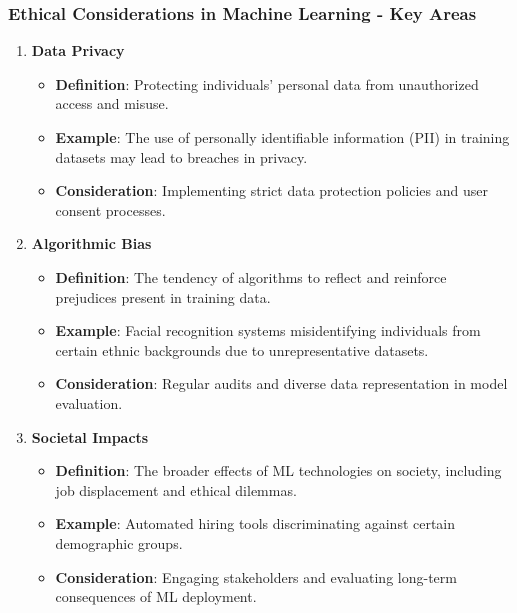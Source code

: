 \documentclass[aspectratio=169]{beamer}
\begin{document}
\begin{frame}[fragile]
    \frametitle{Ethical Considerations in Machine Learning - Key Areas}
    \begin{enumerate}
        \item \textbf{Data Privacy}
            \begin{itemize}
                \item \textbf{Definition}: Protecting individuals' personal data from unauthorized access and misuse.
                \item \textbf{Example}: The use of personally identifiable information (PII) in training datasets may lead to breaches in privacy.
                \item \textbf{Consideration}: Implementing strict data protection policies and user consent processes.
            \end{itemize}
            
        \item \textbf{Algorithmic Bias}
            \begin{itemize}
                \item \textbf{Definition}: The tendency of algorithms to reflect and reinforce prejudices present in training data.
                \item \textbf{Example}: Facial recognition systems misidentifying individuals from certain ethnic backgrounds due to unrepresentative datasets.
                \item \textbf{Consideration}: Regular audits and diverse data representation in model evaluation.
            \end{itemize}
            
        \item \textbf{Societal Impacts}
            \begin{itemize}
                \item \textbf{Definition}: The broader effects of ML technologies on society, including job displacement and ethical dilemmas.
                \item \textbf{Example}: Automated hiring tools discriminating against certain demographic groups.
                \item \textbf{Consideration}: Engaging stakeholders and evaluating long-term consequences of ML deployment.
            \end{itemize}
    \end{enumerate}
\end{frame}
\end{document}
